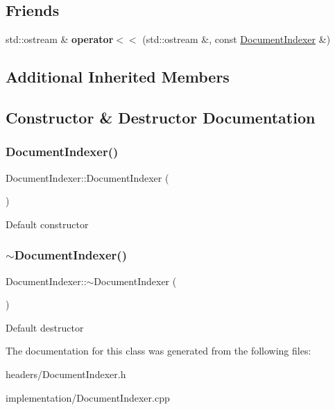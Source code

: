 \subsection*{Friends}
\begin{DoxyCompactItemize}
\item 
\mbox{\label{classDocumentIndexer_a784b00aedd8ffb46de57ea05792250d8}} 
std\+::ostream \& {\bfseries operator$<$$<$} (std\+::ostream \&, const \hyperlink{classDocumentIndexer}{Document\+Indexer} \&)
\end{DoxyCompactItemize}
\subsection*{Additional Inherited Members}


\subsection{Constructor \& Destructor Documentation}
\mbox{\label{classDocumentIndexer_a44f3c39ee50c32c0226fe98a66f71d07}} 
\subsubsection{\texorpdfstring{Document\+Indexer()}{DocumentIndexer()}}
{\footnotesize\ttfamily Document\+Indexer\+::\+Document\+Indexer (\begin{DoxyParamCaption}{ }\end{DoxyParamCaption})}

Default constructor \mbox{\label{classDocumentIndexer_aa3b39750a5477caa4aeab84f1c690c20}} 
\subsubsection{\texorpdfstring{$\sim$\+Document\+Indexer()}{~DocumentIndexer()}}
{\footnotesize\ttfamily Document\+Indexer\+::$\sim$\+Document\+Indexer (\begin{DoxyParamCaption}{ }\end{DoxyParamCaption})}

Default destructor 

The documentation for this class was generated from the following files\+:\begin{DoxyCompactItemize}
\item 
headers/Document\+Indexer.\+h\item 
implementation/Document\+Indexer.\+cpp\end{DoxyCompactItemize}
